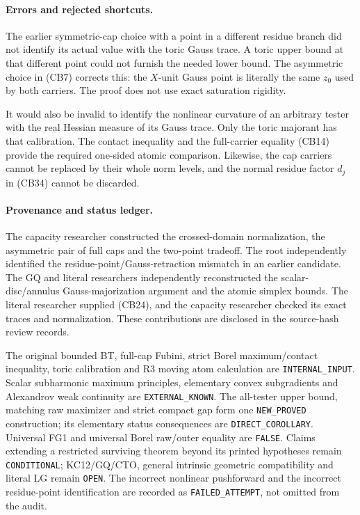 \paragraph{Errors and rejected shortcuts.}
The earlier symmetric-cap choice with a point in a different
residue branch did not identify its actual value with the
toric Gauss trace. A toric upper bound at that different point
could not furnish the needed lower bound. The asymmetric
choice in (CB7) corrects this: the $X$-unit Gauss point is
literally the same $z_0$ used by both carriers. The proof
does not use exact saturation rigidity.

It would also be invalid to identify the nonlinear curvature
of an arbitrary tester with the real Hessian measure of its
Gauss trace. Only the toric majorant has that calibration.
The contact inequality and the full-carrier equality (CB14)
provide the required one-sided atomic comparison. Likewise,
the cap carriers cannot be replaced by their whole norm
levels, and the normal residue factor $d_j$ in (CB34) cannot
be discarded.

\paragraph{Provenance and status ledger.}
The capacity researcher constructed the crossed-domain
normalization, the asymmetric pair of full caps and the
two-point tradeoff. The root independently identified the
residue-point/Gauss-retraction mismatch in an earlier
candidate. The GQ and literal researchers independently
reconstructed the scalar-disc/annulus Gauss-majorization
argument and the atomic simplex bounds. The literal
researcher supplied (CB24), and the capacity researcher
checked its exact traces and normalization. These contributions
are disclosed in the source-hash review records.

The original bounded BT, full-cap Fubini, strict Borel
maximum/contact inequality, toric calibration and R3 moving
atom calculation are \texttt{INTERNAL\_INPUT}. Scalar
subharmonic maximum principles, elementary convex
subgradients and Alexandrov weak continuity are
\texttt{EXTERNAL\_KNOWN}. The all-tester upper bound,
matching raw maximizer and strict compact gap form one
\texttt{NEW\_PROVED} construction; its elementary status
consequences are \texttt{DIRECT\_COROLLARY}. Universal FG1
and universal Borel raw/outer equality are \texttt{FALSE}.
Claims extending a restricted surviving theorem beyond its
printed hypotheses remain \texttt{CONDITIONAL}; KC12/GQ/CTO,
general intrinsic geometric compatibility and literal LG
remain \texttt{OPEN}. The incorrect nonlinear pushforward
and the incorrect residue-point identification are recorded
as \texttt{FAILED\_ATTEMPT}, not omitted from the audit.
